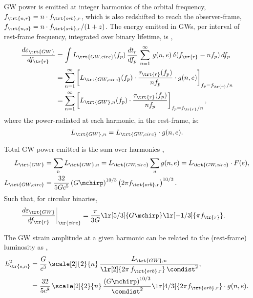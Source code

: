 \documentclass[10pt, oneside, onecolumn]{article}   	%
\newcommand{\hsn}{h_\tr{s,n}}
\newcommand{\frst}{f_\tr{r}}
\newcommand{\frstorb}{f_{\trt{orb},r}}
\newcommand{\frstn}{f_\trt{n,r}}
\newcommand{\fobsn}{f_\trt{n,o}}
\newcommand{\lgw}{L_\trt{GW}}
\newcommand{\lgwn}{L_{\trt{GW},n}}
\newcommand{\lgwc}{L_\trt{GW,circ}}
\newcommand{\egw}{\varepsilon_\trt{GW}}   %
\newcommand{\thard}{\tau_\trt{r}}
\begin{document}
            GW power is emitted at integer harmonics of the orbital frequency, $\frstn = n \cdot \frstorb$, which is also redshifted to reach the observer-frame, $\fobsn = n \cdot \frstorb / (1+z)$.  The energy emitted in GWs, per interval of rest-frame frequency, integrated over binary lifetime, is \citet[][Eq.~3.10]{enoki2007a},
            \begin{subequations}
            \begin{align}
                \label{eq:gw_energy_spectrum}
                \frac{d \egw}{d \frst} & = \int \lgwc(f_p) \, \frac{dt_r}{df_p} \, \sum_{n=1}^\infty \, g(n,e) \, \delta(\frst - n f_p) \, d f_p \\
                    & = \sum_{n=1}^\infty \left[ \lgwc(f_p) \cdot \frac{\thard(f_p)}{n f_p} \cdot g(n,e) \right]_{f_p = \frst/n} \\
                    & = \sum_{n=1}^\infty \left[ \lgwn(f_p) \cdot \frac{\thard(f_p)}{n f_p} \right]_{f_p = \frst/n},
            \end{align}
            \end{subequations}
            where the power-radiated at each harmonic, in the rest-frame, is:
            \begin{equation}
                \lgwn = \lgwc \cdot g(n,e).
            \end{equation}

            Total GW power emitted is the sum over harmonics \citep[][Eq.~2.2]{enoki2007a},
            \begin{align}
                \label{eq:lum_gw}
                \lgw & = \sum_n \lgwn = \lgwc \sum_n g(n,e) = \lgwc \cdot F(e), \\
                \lgwc & = \frac{32}{5 G c^5} \left(G\mchirp\right)^{10/3} \left( 2\pi \frstorb \right)^{10/3}.
            \end{align}
            Such that, for circular binaries,
            \begin{subequations}
            \begin{align}
                \frac{d \egw}{d \frst} \bigg|_{\tr{circ}} & = \frac{\pi}{3 G} \lr[5/3]{G \mchirp} \lr[-1/3]{\pi \frst}.
            \end{align}
            \end{subequations}

            The GW strain amplitude at a given harmonic can be related to the (rest-frame) luminosity as \citep[][Eq.~2.1]{Finn+Thorne-2000},
            \begin{align}
                \label{eq:strain_lum}
                \hsn^2 & = \frac{G}{c^3} \, \scale[2]{2}{n} \, \frac{\lgwn}{\lr[2]{2 \pi \, \frstorb} \, \comdist^2}, \\
                    & = \frac{32}{5 c^8} \, \scale[2]{2}{n} \, \frac{\left(G\mchirp\right)^{10/3}}{\comdist^2} \lr[4/3]{2\pi\frstorb} \cdot g(n,e).
            \end{align}
\end{document}
